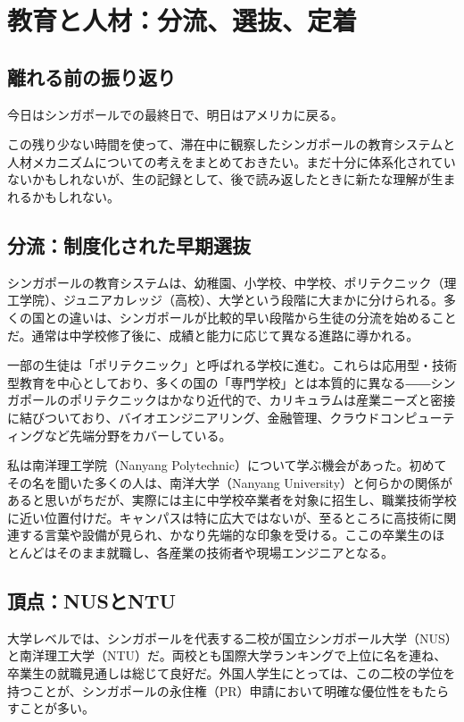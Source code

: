 \chapter{教育と人材：分流、選抜、定着}

\section{離れる前の振り返り}

今日はシンガポールでの最終日で、明日はアメリカに戻る。

この残り少ない時間を使って、滞在中に観察したシンガポールの教育システムと人材メカニズムについての考えをまとめておきたい。まだ十分に体系化されていないかもしれないが、生の記録として、後で読み返したときに新たな理解が生まれるかもしれない。

\section{分流：制度化された早期選抜}

シンガポールの教育システムは、幼稚園、小学校、中学校、ポリテクニック（理工学院）、ジュニアカレッジ（高校）、大学という段階に大まかに分けられる。多くの国との違いは、シンガポールが比較的早い段階から生徒の分流を始めることだ。通常は中学校修了後に、成績と能力に応じて異なる進路に導かれる。

一部の生徒は「ポリテクニック」と呼ばれる学校に進む。これらは応用型・技術型教育を中心としており、多くの国の「専門学校」とは本質的に異なる――シンガポールのポリテクニックはかなり近代的で、カリキュラムは産業ニーズと密接に結びついており、バイオエンジニアリング、金融管理、クラウドコンピューティングなど先端分野をカバーしている。

私は南洋理工学院（Nanyang Polytechnic）について学ぶ機会があった。初めてその名を聞いた多くの人は、南洋大学（Nanyang University）と何らかの関係があると思いがちだが、実際には主に中学校卒業者を対象に招生し、職業技術学校に近い位置付けだ。キャンパスは特に広大ではないが、至るところに高技術に関連する言葉や設備が見られ、かなり先端的な印象を受ける。ここの卒業生のほとんどはそのまま就職し、各産業の技術者や現場エンジニアとなる。

\section{頂点：NUSとNTU}

大学レベルでは、シンガポールを代表する二校が国立シンガポール大学（NUS）と南洋理工大学（NTU）だ。両校とも国際大学ランキングで上位に名を連ね、卒業生の就職見通しは総じて良好だ。外国人学生にとっては、この二校の学位を持つことが、シンガポールの永住権（PR）申請において明確な優位性をもたらすことが多い。

